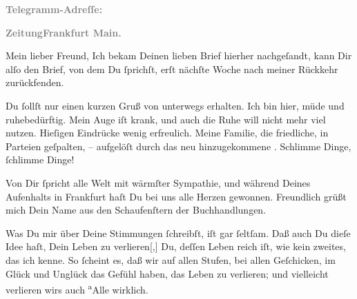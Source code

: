 \pstart
           \textcolor{gray}{\textbf{Telegramm-Adreſſe:}}\pend
           
\pstart
           \textcolor{gray}{\textbf{\textbf{ZeitungFrankfurt Main.}}}\pend
           
\pstart\center{}Mein lieber Freund,\pend\vspace{0.5em}
\pstart
           Ich bekam Deinen lieben Brief hierher nachgeſandt, kann Dir alſo den Brief, von dem
               Du{ }ſprichſt, erſt nächſte Woche nach meiner Rückkehr zurückfenden.\pend
           
\pstart
           Du{ }ſollſt nur einen kurzen Gruß von unterwegs erhalten. Ich bin hier, müde und
               ruhebedürftig. Mein  Auge iſt krank, und  auch die Ruhe will nicht mehr viel nutzen. Hieſigen
               Eindrücke wenig erfreulich. Meine Familie, die {\pb}friedliche, in  Parteien geſpalten, – aufgelöſt durch das neu hinzugekommene \label{K_L02771-1v}\label{K_L02771-1}.
               Schlimme Dinge,{ }ſchlimme Dinge!\pend
           
\pstart
           Von Dir{ }ſpricht alle Welt mit wärmſter Sympathie, und während Deines Aufenhalts in
                  Frankfurt haſt Du bei uns alle Herzen
               gewonnen. Freundlich grüßt mich Dein Name aus den Schaufenſtern der
               Buchhandlungen.\pend
           
\pstart
           Was Du mir über Deine Stimmungen{ }ſchreibſt, iſt gar{ }ſeltſam. Daß auch Du dieſe Idee
               haſt, Dein Leben zu verlieren{[},{]}{ }{\pb}Du, deſſen Leben reich iſt, wie kein zweites, das
               ich kenne. So{ }ſcheint es, daß \strikeout{\textcolor{gray}{×}} wir auf allen Stufen, bei allen Geſchicken, im Glück und Unglück das Gefühl
               haben, das Leben zu verlieren; und vielleicht verlieren wirs auch \substVorne{}\textsuperscript{a}\substDazwischen{}A\substHinten{}lle wirklich.\pend
           
